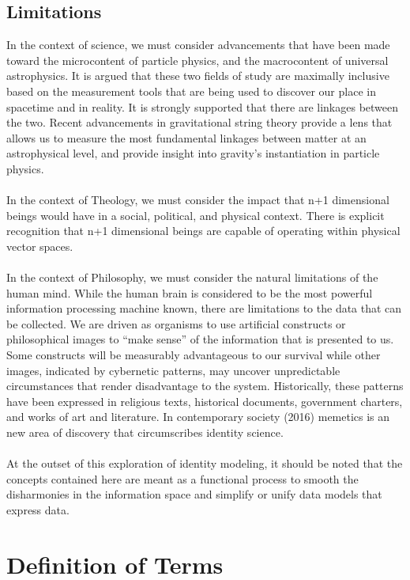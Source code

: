 \documentclass{article}
\begin{document}
\subsection{Limitations}
In the context of science, we must consider advancements that have been made toward the microcontent of particle physics, and the macrocontent of universal astrophysics.  It is argued that these two fields of study are maximally inclusive based on the measurement tools that are being used to discover our place in spacetime and in reality.  It is strongly supported that there are linkages between the two.  Recent advancements in gravitational string theory provide a lens that allows us to measure the most fundamental linkages between matter at an astrophysical level, and provide insight into gravity’s instantiation in particle physics.\\\\
In the context of Theology, we must consider the impact that n+1 dimensional beings would have in a social, political, and physical context.  There is explicit recognition that n+1 dimensional beings are capable of operating within physical vector spaces.\\ \\
In the context of Philosophy, we must consider the natural limitations of the human mind.  While the human brain is considered to be the most powerful information processing machine known, there are limitations to the data that can be collected.  We are driven as organisms to use artificial constructs or philosophical images to “make sense” of the information that is presented to us. Some constructs will be measurably advantageous to our survival while other images, indicated by cybernetic patterns, may uncover unpredictable circumstances that render disadvantage to the system.  Historically, these patterns have been expressed in religious texts, historical documents, government charters, and works of art and literature.  In contemporary society (2016) memetics is an new area of discovery that circumscribes identity science.\\\\
At the outset of this exploration of identity modeling, it should be noted that the concepts contained here are meant as a functional process to smooth the disharmonies in the information space and simplify or unify data models that express data. 

\section{Definition of Terms}
\end{document}
